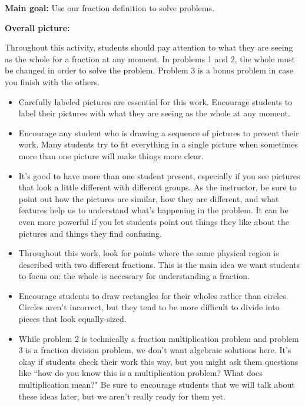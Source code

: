 \documentclass[nooutcomes,noauthor]{ximera}
\begin{document}
\begin{instructorNotes} 



{\bf Main goal:} Use our fraction definition to solve problems.

{\bf Overall picture:} 

Throughout this activity, students should pay attention to what they are seeing as the whole for a fraction at any moment. In problems 1 and 2, the whole must be changed in order to solve the problem. Problem 3 is a bonus problem in case you finish with the others. 

\begin{itemize}
	\item Carefully labeled pictures are essential for this work. Encourage students to label their pictures with what they are seeing as the whole at any moment.
	\item Encourage any student who is drawing a sequence of pictures to present their work. Many students try to fit everything in a single picture when sometimes more than one picture will make things more clear.
	\item It's good to have more than one student present, especially if you see pictures that look a little different with different groups. As the instructor, be sure to point out how the pictures are similar, how they are different, and what features help us to understand what's happening in the problem. It can be even more powerful if you let students point out things they like about the pictures and things they find confusing.
	\item Throughout this work, look for points where the same physical region is described with two different fractions. This is the main idea we want students to focus on: the whole is necessary for understanding a fraction.
	\item Encourage students to draw rectangles for their wholes rather than circles. Circles aren't incorrect, but they tend to be more difficult to divide into pieces that look equally-sized.
	\item While problem 2 is technically a fraction multiplication problem and problem 3 is a fraction division problem, we don't want algebraic solutions here. It's okay if students check their work this way, but you might ask them questions like ``how do you know this is a multiplication problem? What does multiplication mean?" Be sure to encourage students that we will talk about these ideas later, but we aren't really ready for them yet.
\end{itemize}



\end{instructorNotes}
\end{document}
